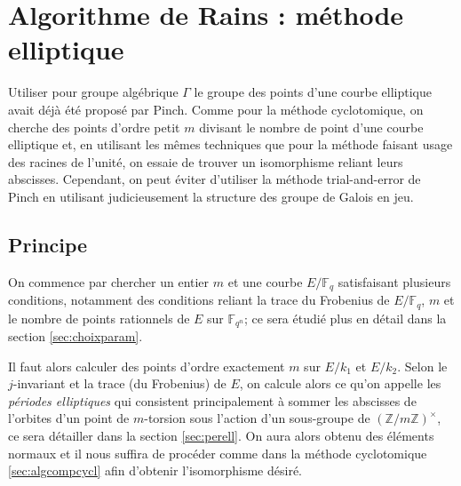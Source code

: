 \documentclass[a4paper]{article} %
\numberwithin{section}{part}
\numberwithin{equation}{section}
\newcommand\zmodninv[1]{(\mathbb{Z}/#1\mathbb{Z})^{\times}}
\newcommand\GF[1]{\mathbb{F}_{#1}}
\begin{document}
\section{Algorithme de Rains : méthode elliptique}
Utiliser pour groupe algébrique $\Gamma$ le groupe des points d'une courbe
elliptique avait déjà été proposé par Pinch\cite{Pin}. Comme pour la méthode
cyclotomique, on cherche des points d'ordre petit $m$ divisant le nombre de
point d'une courbe elliptique et, en utilisant les mêmes techniques que pour la
méthode faisant usage des racines de l'unité, on essaie de trouver un
isomorphisme reliant leurs abscisses. Cependant, on peut éviter d'utiliser la
méthode trial-and-error de Pinch en utilisant judicieusement la structure des
groupe de Galois en jeu. 
\subsection{Principe}
On commence par chercher un entier $m$ et une courbe $E/\GF{q}$ satisfaisant
plusieurs conditions, notamment des conditions reliant la trace du Frobenius de
$E/\GF{q}$, $m$ et le nombre de points rationnels de $E$ sur $\GF{q^n}$; ce sera
étudié plus en détail dans la section \ref{sec:choixparam}.\par
Il faut alors calculer des points d'ordre exactement $m$ sur $E/k_1$ et $E/k_2$.
Selon le $j$-invariant et la trace (du Frobenius) de $E$, on calcule alors  
ce qu'on appelle les \emph{périodes elliptiques} qui consistent principalement à
sommer les abscisses de l'orbites d'un point de $m$-torsion sous l'action d'un
sous-groupe de $\zmodninv{m}$, ce sera détailler dans la section
\ref{sec:perell}. On aura alors obtenu des éléments normaux et il nous suffira 
de procéder comme dans la méthode cyclotomique \ref{sec:algcompcycl} afin
d'obtenir l'isomorphisme désiré.
\end{document}
